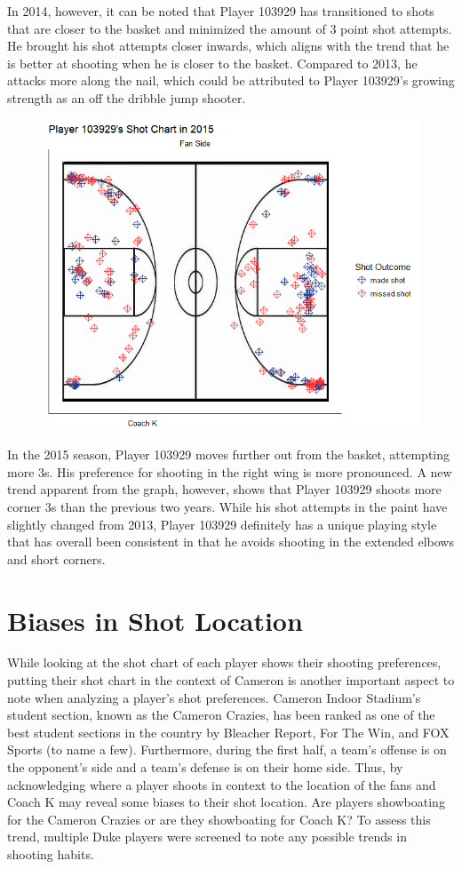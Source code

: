 \documentclass[12pt,twoside]{dukestatscithesis}
\theoremstyle{definition}
\theoremstyle{definition}
\theoremstyle{definition}
\theoremstyle{remark}
\begin{document}
In 2014, however, it can be noted that Player 103929 has transitioned to
shots that are closer to the basket and minimized the amount of 3 point
shot attempts. He brought his shot attempts closer inwards, which aligns
with the trend that he is better at shooting when he is closer to the
basket. Compared to 2013, he attacks more along the nail, which could be
attributed to Player 103929's growing strength as an off the dribble
jump shooter.
\begin{figure}
\centering
\includegraphics{img/qc2015.png}
\caption{}
\end{figure}
In the 2015 season, Player 103929 moves further out from the basket,
attempting more 3s. His preference for shooting in the right wing is
more pronounced. A new trend apparent from the graph, however, shows
that Player 103929 shoots more corner 3s than the previous two years.
While his shot attempts in the paint have slightly changed from 2013,
Player 103929 definitely has a unique playing style that has overall
been consistent in that he avoids shooting in the extended elbows and
short corners.

\section{Biases in Shot Location}\label{biases-in-shot-location}

While looking at the shot chart of each player shows their shooting
preferences, putting their shot chart in the context of Cameron is
another important aspect to note when analyzing a player's shot
preferences. Cameron Indoor Stadium's student section, known as the
Cameron Crazies, has been ranked as one of the best student sections in
the country by Bleacher Report, For The Win, and FOX Sports (to name a
few). Furthermore, during the first half, a team's offense is on the
opponent's side and a team's defense is on their home side. Thus, by
acknowledging where a player shoots in context to the location of the
fans and Coach K may reveal some biases to their shot location. Are
players showboating for the Cameron Crazies or are they showboating for
Coach K? To assess this trend, multiple Duke players were screened to
note any possible trends in shooting habits.
\end{document}
